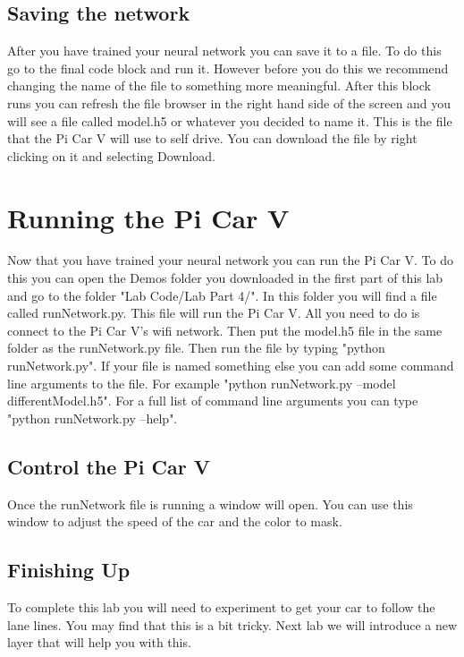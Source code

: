 \documentclass[11pt]{report}
\begin{document}
\section{Saving the network}
After you have trained your neural network you can save it to a file. To do this go to the final code block and run it. However before you do this we recommend changing the name of the file to something more meaningful. After this block runs you can refresh the file browser in the right hand side of the screen and you will see a file called model.h5 or whatever you decided to name it. This is the file that the Pi Car V will use to self drive. You can download the file by right clicking on it and selecting Download. 

\chapter{Running the Pi Car V}
Now that you have trained your neural network you can run the Pi Car V. To do this you can open the Demos folder you downloaded in the first part of this lab and go to the folder "Lab Code/Lab Part 4/". In this folder you will find a file called runNetwork.py. This file will run the Pi Car V. All you need to do is connect to the Pi Car V's wifi network.
Then put the model.h5 file in the same folder as the runNetwork.py file. Then run the file by typing "python runNetwork.py". If your file is named something else you can add some command line arguments to the file. For example "python runNetwork.py --model differentModel.h5". For a full list of command line arguments you can type "python runNetwork.py --help".

\section{Control the Pi Car V}
Once the runNetwork file is running a window will open. You can use this window to adjust the speed of the car and the color to mask.

\section{Finishing Up}
To complete this lab you will need to experiment to get your car to follow the lane lines. You may find that this is a bit tricky. Next lab we will introduce a new layer that will help you with this.
\end{document}
